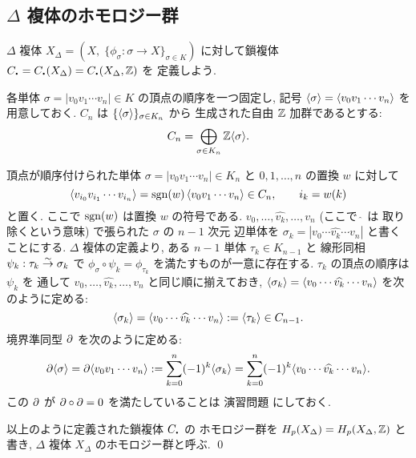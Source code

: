 \documentclass[12pt,twoside]{jarticle}
\begin{document}

\subsection{$\Delta$ 複体のホモロジー群}
\label{sec:Delta-homology}

\begin{definition}
 $\Delta$ 複体 $X_\Delta=(X,\; \{\phi_\sigma:\sigma\to X\}_{\sigma\in K})$ 
 に対して鎖複体 $C_\bcdot=C_\bcdot(X_\Delta)=C_\bcdot(X_\Delta,\Z)$ を
 定義しよう. 

 各単体 $\sigma=|v_0v_1\cdots v_n|\in K$ の頂点の順序を一つ固定し, 
 記号 $\langle\sigma\rangle = \langle v_0v_1\cdots v_n\rangle$ を用意しておく.
 $C_n$ は $\{\langle\sigma\rangle\}_{\sigma\in K_n}$ から
 生成された自由 ${\mathbb Z}$ 加群であるとする:
 \begin{equation*}
  C_n = \bigoplus_{\sigma\in K_n} {\mathbb Z}\langle\sigma\rangle.
 \end{equation*}

 頂点が順序付けられた単体 $\sigma=|v_0v_1\cdots v_n|\in K_n$ 
 と $0,1,\ldots,n$ の置換 $w$ に対して
 \begin{equation*}
  \langle v_{i_0}v_{i_1}\cdots v_{i_n}\rangle 
  = \mathop{\mathrm{sgn}}\nolimits(w) \,\langle v_0v_1\cdots v_n\rangle \in C_n,
  \qquad
  i_k = w(k)
 \end{equation*}
 と置く. ここで $\mathop{\mathrm{sgn}}\nolimits(w)$ は置換 $w$ の符号である.
 $v_0,\ldots,\widehat{v_k},\ldots,v_n$ (ここで $\widehat{\ }$ は
 取り除くという意味) で張られた $\sigma$ の $n-1$ 次元
 辺単体を $\sigma_k = |v_0\cdots\widehat{v_k}\cdots v_n|$ と書くことにする.
 $\Delta$ 複体の定義より, 
 ある $n-1$ 単体 $\tau_k\in K_{n-1}$ と
 線形同相 $\psi_k:\tau_k\overset\sim\rightarrow\sigma_k$ 
 で  $\phi_\sigma\circ\psi_k=\phi_{\tau_k}$ を満たすものが一意に存在する.
 $\tau_k$ の頂点の順序は $\psi_k$ を
 通して $v_0,\ldots,\widehat{v_k},\ldots,v_n$ と同じ順に揃えておき, 
 $\langle\sigma_k\rangle = \langle v_0\cdots\widehat{v_k}\cdots v_n\rangle$
 を次のように定める:
 \begin{equation*}
  \langle\sigma_k\rangle
  = \langle v_0\cdots\widehat{v_k}\cdots v_n\rangle
  := \langle\tau_k\rangle \in C_{n-1}.
 \end{equation*}
 境界準同型 $\partial$ を次のように定める:
 \begin{equation*}
  \partial\langle\sigma\rangle = \partial\langle v_0v_1\cdots v_n\rangle
  := \sum_{k=0}^n (-1)^k \langle\sigma_k\rangle 
  =  \sum_{k=0}^n (-1)^k \langle v_0\cdots\widehat{v_k}\cdots v_n\rangle.
 \end{equation*}
 この $\partial$ が $\partial\circ\partial = 0$ を満たしていることは
 演習問題  にしておく.

 以上のように定義された鎖複体 $C_\bcdot$ の
 ホモロジー群を $H_p(X_\Delta)=H_p(X_\Delta,{\mathbb Z})$ と書き, %
 $\Delta$ 複体 $X_\Delta$ のホモロジー群と呼ぶ.
 \qed
\end{definition}
\end{document}
